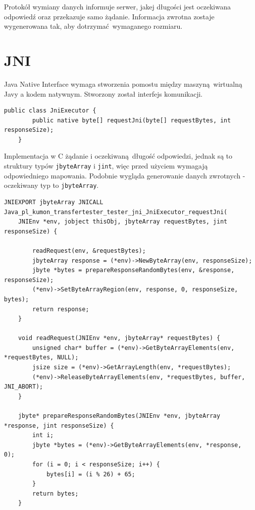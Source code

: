 Protokół wymiany danych informuje serwer, jakej długości jest oczekiwana odpowiedź oraz przekazuje samo żądanie. Informacja zwrotna zostaje wygenerowana tak, aby dotrzymać wymaganego rozmiaru.


\section{JNI}

Java Native Interface wymaga stworzenia pomostu między maszyną wirtualną Javy a kodem natywnym. Stworzony został interfejs komunikacji.

\begin{lstlisting}[caption={Metoda javy, która wymaga natywnej implementacji.},captionpos=b]
    public class JniExecutor {
        public native byte[] requestJni(byte[] requestBytes, int responseSize);
    }
\end{lstlisting}

Implementacja w C żądanie i oczekiwaną długość odpowiedzi, jednak są to struktury typów \texttt{jbyteArray} i \texttt{jint}, więc przed użyciem wymagają odpowiedniego mapowania. Podobnie wygląda generowanie danych zwrotnych - oczekiwany typ to \texttt{jbyteArray}.

\begin{lstlisting}[caption={Natywna implementacja w C.},captionpos=b]
    JNIEXPORT jbyteArray JNICALL Java_pl_kumon_transfertester_tester_jni_JniExecutor_requestJni(
    JNIEnv *env, jobject thisObj, jbyteArray requestBytes, jint responseSize) {

        readRequest(env, &requestBytes);
        jbyteArray response = (*env)->NewByteArray(env, responseSize);
        jbyte *bytes = prepareResponseRandomBytes(env, &response, responseSize);
        (*env)->SetByteArrayRegion(env, response, 0, responseSize, bytes);
        return response;
    }

    void readRequest(JNIEnv *env, jbyteArray* requestBytes) {
        unsigned char* buffer = (*env)->GetByteArrayElements(env, *requestBytes, NULL);
        jsize size = (*env)->GetArrayLength(env, *requestBytes);
        (*env)->ReleaseByteArrayElements(env, *requestBytes, buffer, JNI_ABORT);
    }

    jbyte* prepareResponseRandomBytes(JNIEnv *env, jbyteArray *response, jint responseSize) {
        int i;
        jbyte *bytes = (*env)->GetByteArrayElements(env, *response, 0);
        for (i = 0; i < responseSize; i++) {
            bytes[i] = (i % 26) + 65;
        }
        return bytes;
    }
\end{lstlisting}


